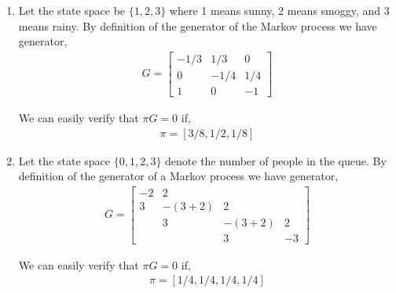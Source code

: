 \begin{solution}[Solution]
\begin{enumerate}[label=(\alph*)]
    \item Let the state space be \( \{1,2,3\} \) where 1 means sunny, 2 means smoggy, and 3 means rainy.
        By definition of the generator of the Markov process we have generator,
        \begin{align*}
            G = \left[\begin{array}{rrr}
            -1/3 & 1/3 & 0 \\
                0 & -1/4 & 1/4 \\
            1 & 0 & -1
            \end{array}\right]
        \end{align*}
        
        We can easily verify that \( \pi G = 0 \) if,
        \begin{align*}
            \pi = [3/8,1/2,1/8]
        \end{align*} 

    \item 
        Let the state space \( \{0,1,2,3\} \) denote the number of people in the queue. 
        By definition of the generator of a Markov process we have generator,
        \begin{align*}
            G= \left[\begin{array}{rrrr}
                -2 & 2 \\
                3 & -(3+2) & 2 \\
                & 3 & -(3+2) & 2 \\
                & & 3 & -3
            \end{array}\right]
        \end{align*}

        We can easily verify that \( \pi G = 0 \) if,
        \begin{align*}
            \pi = [1/4,1/4,1/4,1/4]
        \end{align*}     


\end{enumerate}
\end{solution}


